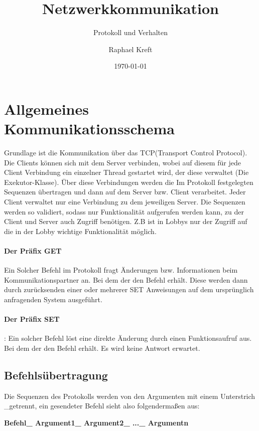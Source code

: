 \documentclass[a4paper, 12pt, oneside, headsepline=.5pt,footsepline=.5pt]{scrartcl}
\title{Netzwerkkommunikation}
\subtitle{Protokoll und Verhalten}
\author{Raphael Kreft}
\date{\today}
\begin{document}
\maketitle
\tableofcontents
\clearpage
\setcounter{page}{1}

\section{Allgemeines Kommunikationsschema}
Grundlage ist die Kommunikation über das TCP(Transport Control Protocol).
Die Clients können sich mit dem Server verbinden, wobei auf diesem für jede Client Verbindung ein einzelner Thread gestartet wird, der diese verwaltet (Die Exekutor-Klasse). 
Über diese Verbindungen werden die Im Protokoll festgelegten Sequenzen übertragen und dann auf dem Server bzw. Client verarbeitet.
\newline
Jeder Client verwaltet nur eine Verbindung zu dem jeweiligen Server.
\newline
Die Sequenzen werden so validiert, sodass nur Funktionalität aufgerufen werden kann, zu der Client und Server auch Zugriff benötigen. Z.B ist in Lobbys nur der Zugriff auf die in der Lobby wichtige Funktionalität möglich.

\paragraph{\textbf{Der Präfix GET}}
Ein Solcher Befehl im Protokoll fragt Änderungen bzw. Informationen beim Kommunikationspartner an. Bei dem der den Befehl erhält. Diese werden dann durch zurücksenden einer oder mehrerer SET Anweisungen auf dem ursprünglich anfragenden System ausgeführt.

\paragraph{\textbf{Der Präfix SET}}: Ein solcher Befehl löst eine direkte Änderung durch einen Funktionsaufruf aus. Bei dem der den Befehl erhält. Es wird keine Antwort erwartet.

\subsection{Befehlsübertragung}

Die Sequenzen des Protokolls werden von den Argumenten mit einem Unterstrich \glqq \_\grqq getrennt, ein gesendeter Befehl sieht also folgendermaßen aus:
\begin{center}
\textbf{\large Befehl\_ Argument1\_ Argument2\_ ...\_ Argumentn}
\end{center}
\end{document}
